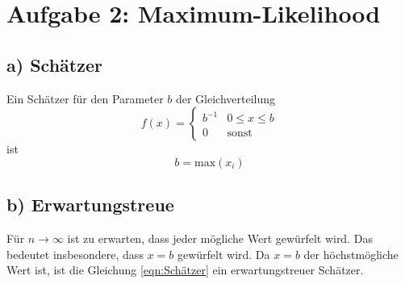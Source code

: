 \section*{Aufgabe 2: Maximum-Likelihood}
\label{sec:Aufgabe2}

\subsection*{a) Schätzer}
\label{sub:Schätzer}
Ein Schätzer für den Parameter $b$ der Gleichverteilung
\begin{equation}
    f(x)=\begin{cases}
        b^{-1} &0\leq x \leq b\\
        0&\text{sonst}
    \end{cases}
\end{equation}
ist
\begin{equation}
    b=\text{max}(x_i)
    \label{eqn:Schätzer}
\end{equation}

\subsection*{b) Erwartungstreue}
\label{sub:Erwartungstreue}
Für $n\rightarrow \infty$ ist zu erwarten, dass jeder mögliche Wert gewürfelt wird.
Das bedeutet insbesondere, dass $x=b$ gewürfelt wird.
Da $x=b$ der höchstmögliche Wert ist, ist die Gleichung \eqref{eqn:Schätzer} ein erwartungstreuer Schätzer.